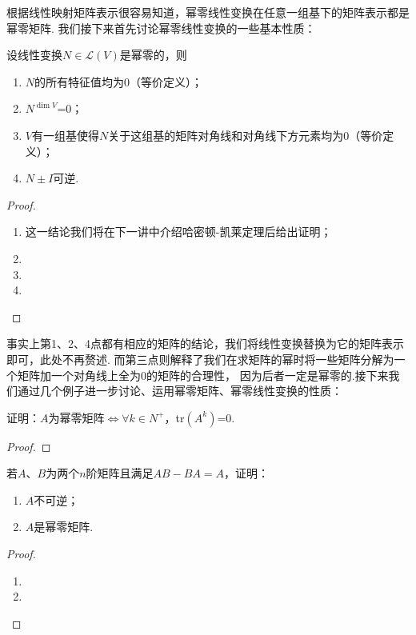 根据线性映射矩阵表示很容易知道，幂零线性变换在任意一组基下的矩阵表示都是幂零矩阵.
我们接下来首先讨论幂零线性变换的一些基本性质：
\begin{theorem} \label{thm:19:幂零线性变换性质}
    设线性变换$N\in \mathcal{L}(V)$是幂零的，则
    \begin{enumerate}[label=(\arabic*)]
        \item $N$的所有特征值均为0（等价定义）；

        \item $N^{\dim V}$=0；

        \item $V$有一组基使得$N$关于这组基的矩阵对角线和对角线下方元素均为0（等价定义）；

        \item $N\pm I$可逆.
    \end{enumerate}
\end{theorem}
\begin{proof}
    \begin{enumerate}[label=(\arabic*)]
        \item 这一结论我们将在下一讲中介绍哈密顿-凯莱定理后给出证明；
        \item 
        \item 
        \item 
    \end{enumerate}
\end{proof}

事实上第1、2、4点都有相应的矩阵的结论，我们将线性变换替换为它的矩阵表示即可，此处不再赘述.
而第三点则解释了我们在求矩阵的幂时将一些矩阵分解为一个矩阵加一个对角线上全为0的矩阵的合理性，
因为后者一定是幂零的.接下来我们通过几个例子进一步讨论、运用幂零矩阵、幂零线性变换的性质：
\begin{example}
    证明：$A$为幂零矩阵$\iff \forall k \in N^+$，\textup{tr}$(A^k)$=\textup{0}.
\end{example}
\begin{proof}

\end{proof}

\begin{example}
	若$A$、$B$为两个$n$阶矩阵且满足$AB-BA=A$，证明：
    \begin{enumerate}[label=(\arabic*)]
        \item $A$不可逆；
        \item $A$是幂零矩阵.
    \end{enumerate}
\end{example}
\begin{proof}
    \begin{enumerate}[label=(\arabic*)]
        \item 
        \item 
    \end{enumerate}
\end{proof}

